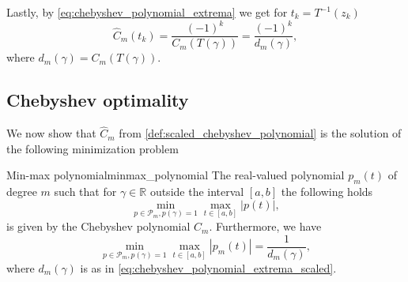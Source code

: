 Lastly, by \cref{eq:chebyshev_polynomial_extrema} we get for $t_k = T^{-1}(z_k)$
\begin{equation}
    \hat{C}_m(t_k) = \frac{(-1)^k}{C_m(T(\gamma))} = \frac{(-1)^k}{d_m(\gamma)},
    \label{eq:chebyshev_polynomial_extrema_scaled}
\end{equation}
where $d_m(\gamma) = C_m(T(\gamma))$. 

\subsection{Chebyshev optimality}
We now show that $\hat{C}_m$ from \cref{def:scaled_chebyshev_polynomial} is the solution of the following minimization problem
\begin{APPfancyth}{Min-max polynomial}{minmax_polynomial}
  The real-valued polynomial $p_m(t)$ of degree $m$ such that for $\gamma\in\mathbb{R}$ outside the interval $[a, b]$ the following holds
  \[
    \min_{p\in\mathcal{P}_m,p(\gamma)=1} \max_{t\in[a,b]} |p(t)|,
  \]
  is given by the Chebyshev polynomial $\hat{C}_m$. Furthermore, we have
  \[
    \min_{p\in\mathcal{P}_m,p(\gamma)=1} \max_{t\in[a,b]} |p_m(t)| = \frac{1}{d_m(\gamma)},
  \]
  where $d_m(\gamma)$ is as in \cref{eq:chebyshev_polynomial_extrema_scaled}.
\end{APPfancyth}
